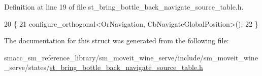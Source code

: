 Definition at line 19 of file st\+\_\+bring\+\_\+bottle\+\_\+back\+\_\+navigate\+\_\+source\+\_\+table.\+h.


\begin{DoxyCode}
20         \{
21             configure\_orthogonal<OrNavigation, CbNavigateGlobalPosition>();
22         \}
\end{DoxyCode}


The documentation for this struct was generated from the following file\+:\begin{DoxyCompactItemize}
\item 
smacc\+\_\+sm\+\_\+reference\+\_\+library/sm\+\_\+moveit\+\_\+wine\+\_\+serve/include/sm\+\_\+moveit\+\_\+wine\+\_\+serve/states/\hyperlink{st__bring__bottle__back__navigate__source__table_8h}{st\+\_\+bring\+\_\+bottle\+\_\+back\+\_\+navigate\+\_\+source\+\_\+table.\+h}\end{DoxyCompactItemize}
